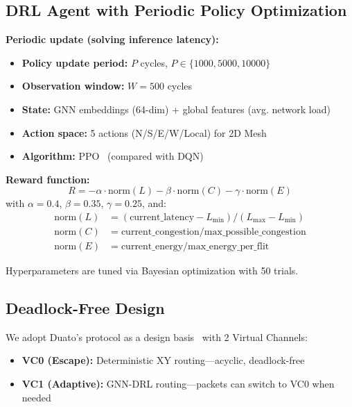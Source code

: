 \documentclass[conference]{IEEEtran}
\begin{document}
\subsection{DRL Agent with Periodic Policy Optimization}
\label{sec:drl-agent}

\textbf{Periodic update (solving inference latency):}
\begin{itemize}
 \item \textbf{Policy update period:} $P$ cycles, $P\in\{1000,5000,10000\}$
 \item \textbf{Observation window:} $W=500$ cycles
 \item \textbf{State:} GNN embeddings (64-dim) + global features (avg. network load)
 \item \textbf{Action space:} 5 actions (N/S/E/W/Local) for 2D Mesh
 \item \textbf{Algorithm:} PPO~\cite{ppo2017} (compared with DQN)
\end{itemize}

\textbf{Reward function:}
\begin{equation}
R = -\alpha\cdot\text{norm}(L) - \beta\cdot\text{norm}(C) - \gamma\cdot\text{norm}(E)
\label{eq:reward}
\end{equation}
with $\alpha=0.4$, $\beta=0.35$, $\gamma=0.25$, and:
\begin{align}
\text{norm}(L) &= (\text{current\_latency} - L_{\min})/(L_{\max} - L_{\min}) \nonumber\\
\text{norm}(C) &= \text{current\_congestion} / \text{max\_possible\_congestion} \nonumber\\
\text{norm}(E) &= \text{current\_energy} / \text{max\_energy\_per\_flit} \nonumber
\end{align}

Hyperparameters are tuned via Bayesian optimization with 50 trials.

\subsection{Deadlock-Free Design}
\label{sec:deadlock}

We adopt Duato's protocol as a design basis~\cite{duato1996} with 2 Virtual Channels:
\begin{itemize}
 \item \textbf{VC0 (Escape):} Deterministic XY routing---acyclic, deadlock-free
 \item \textbf{VC1 (Adaptive):} GNN-DRL routing---packets can switch to VC0 when needed
\end{itemize}
\end{document}
